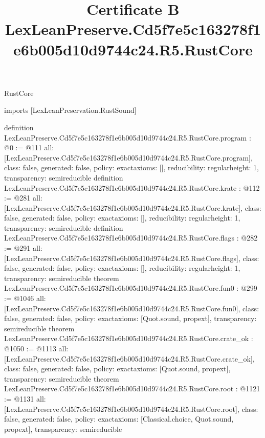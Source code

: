 \begin{lexlean}{RustCore}
\title{Certificate B LexLeanPreserve.Cd5f7e5c163278f1e6b005d10d9744c24.R5.RustCore}
\begin{coremodule}
imports [LexLeanPreservation.RustSound]

definition LexLeanPreserve.Cd5f7e5c163278f1e6b005d10d9744c24.R5.RustCore.program : @0 := @111 {
  all: [LexLeanPreserve.Cd5f7e5c163278f1e6b005d10d9744c24.R5.RustCore.program],
  class: false,
  generated: false,
  policy: exact{axioms: []},
  reducibility: regular{height: 1},
  transparency: semireducible
}
definition LexLeanPreserve.Cd5f7e5c163278f1e6b005d10d9744c24.R5.RustCore.krate : @112 := @281 {
  all: [LexLeanPreserve.Cd5f7e5c163278f1e6b005d10d9744c24.R5.RustCore.krate],
  class: false,
  generated: false,
  policy: exact{axioms: []},
  reducibility: regular{height: 1},
  transparency: semireducible
}
definition LexLeanPreserve.Cd5f7e5c163278f1e6b005d10d9744c24.R5.RustCore.flags : @282 := @291 {
  all: [LexLeanPreserve.Cd5f7e5c163278f1e6b005d10d9744c24.R5.RustCore.flags],
  class: false,
  generated: false,
  policy: exact{axioms: []},
  reducibility: regular{height: 1},
  transparency: semireducible
}
theorem LexLeanPreserve.Cd5f7e5c163278f1e6b005d10d9744c24.R5.RustCore.fun0 : @299 := @1046 {
  all: [LexLeanPreserve.Cd5f7e5c163278f1e6b005d10d9744c24.R5.RustCore.fun0],
  class: false,
  generated: false,
  policy: exact{axioms: [Quot.sound, propext]},
  transparency: semireducible
}
theorem LexLeanPreserve.Cd5f7e5c163278f1e6b005d10d9744c24.R5.RustCore.crate_ok : @1050 := @1113 {
  all: [LexLeanPreserve.Cd5f7e5c163278f1e6b005d10d9744c24.R5.RustCore.crate_ok],
  class: false,
  generated: false,
  policy: exact{axioms: [Quot.sound, propext]},
  transparency: semireducible
}
theorem LexLeanPreserve.Cd5f7e5c163278f1e6b005d10d9744c24.R5.RustCore.root : @1121 := @1131 {
  all: [LexLeanPreserve.Cd5f7e5c163278f1e6b005d10d9744c24.R5.RustCore.root],
  class: false,
  generated: false,
  policy: exact{axioms: [Classical.choice, Quot.sound, propext]},
  transparency: semireducible
}


\end{coremodule}
\end{lexlean}
